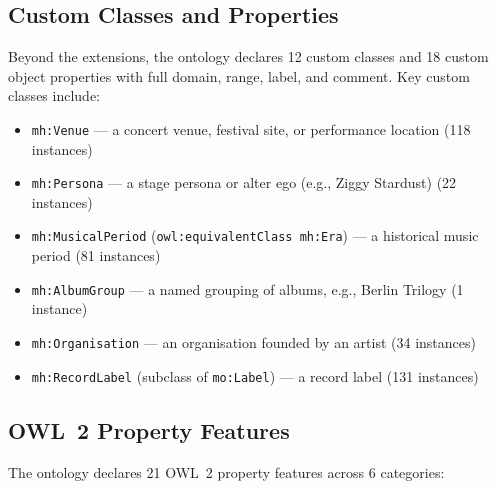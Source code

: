\documentclass[11pt,a4paper]{article}
\begin{document}
\subsection{Custom Classes and Properties}

Beyond the extensions, the ontology declares 12 custom classes and 18 custom object properties with full domain, range, label, and comment. Key custom classes include:

\begin{itemize}[nosep]
  \item \texttt{mh:Venue} --- a concert venue, festival site, or performance location (118 instances)
  \item \texttt{mh:Persona} --- a stage persona or alter ego (e.g., Ziggy Stardust) (22 instances)
  \item \texttt{mh:MusicalPeriod} (\texttt{owl:equivalentClass mh:Era}) --- a historical music period (81 instances)
  \item \texttt{mh:AlbumGroup} --- a named grouping of albums, e.g., Berlin Trilogy (1 instance)
  \item \texttt{mh:Organisation} --- an organisation founded by an artist (34 instances)
  \item \texttt{mh:RecordLabel} (subclass of \texttt{mo:Label}) --- a record label (131 instances)
\end{itemize}

\subsection{OWL~2 Property Features}

The ontology declares 21 OWL~2 property features across 6 categories:
\end{document}
